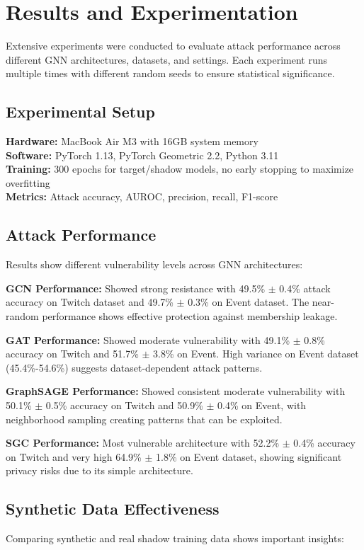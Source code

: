 \documentclass{article}
\begin{document}
\section{Results and Experimentation}
\label{results}
Extensive experiments were conducted to evaluate attack performance across different GNN architectures, datasets, and settings. Each experiment runs multiple times with different random seeds to ensure statistical significance.

\subsection{Experimental Setup}
\textbf{Hardware:} MacBook Air M3 with 16GB system memory\\
\textbf{Software:} PyTorch 1.13, PyTorch Geometric 2.2, Python 3.11\\
\textbf{Training:} 300 epochs for target/shadow models, no early stopping to maximize overfitting\\
\textbf{Metrics:} Attack accuracy, AUROC, precision, recall, F1-score

\subsection{Attack Performance}
Results show different vulnerability levels across GNN architectures:

\textbf{GCN Performance:} Showed strong resistance with 49.5\% $\pm$ 0.4\% attack accuracy on Twitch dataset and 49.7\% $\pm$ 0.3\% on Event dataset. The near-random performance shows effective protection against membership leakage.

\textbf{GAT Performance:} Showed moderate vulnerability with 49.1\% $\pm$ 0.8\% accuracy on Twitch and 51.7\% $\pm$ 3.8\% on Event. High variance on Event dataset (45.4\%-54.6\%) suggests dataset-dependent attack patterns.

\textbf{GraphSAGE Performance:} Showed consistent moderate vulnerability with 50.1\% $\pm$ 0.5\% accuracy on Twitch and 50.9\% $\pm$ 0.4\% on Event, with neighborhood sampling creating patterns that can be exploited.

\textbf{SGC Performance:} Most vulnerable architecture with 52.2\% $\pm$ 0.4\% accuracy on Twitch and very high 64.9\% $\pm$ 1.8\% on Event dataset, showing significant privacy risks due to its simple architecture.

\subsection{Synthetic Data Effectiveness}
Comparing synthetic and real shadow training data shows important insights:
\end{document}
